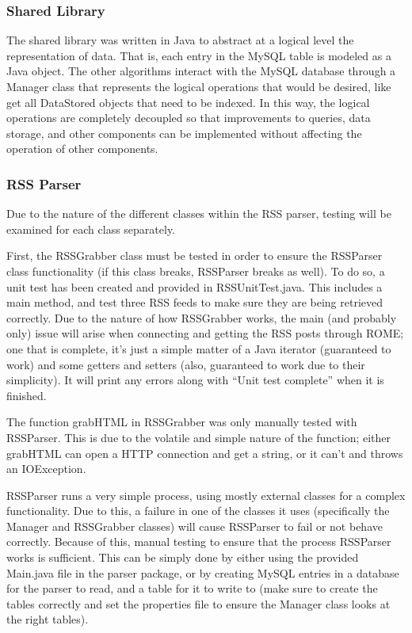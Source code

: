 \documentclass[10pt]{article} %
\begin{document}
\subsubsection{Shared Library}

The shared library was written in Java to abstract at a logical level the representation of data. That is, each entry in the MySQL table is modeled as a Java object. The other algorithms interact with the MySQL database through a Manager class that represents the logical operations that would be desired, like get all DataStored objects that need to be indexed. In this way, the logical operations are completely decoupled so that improvements to queries, data storage, and other components can be implemented without affecting the operation of other components.

\subsubsection{RSS Parser}

Due to the nature of the different classes within the RSS parser, testing will be examined for each class separately.

First, the RSSGrabber class must be tested in order to ensure the RSSParser class functionality (if this class breaks, RSSParser breaks as well). To do so, a unit test has been created and provided in RSSUnitTest.java. This includes a main method, and test three RSS feeds to make sure they are being retrieved correctly. Due to the nature of how RSSGrabber works, the main (and probably only) issue will arise when connecting and getting the RSS posts through ROME; one that is complete, it’s just a simple matter of a Java iterator (guaranteed to work) and some getters and setters (also, guaranteed to work due to their simplicity). It will print any errors along with “Unit test complete” when it is finished.

The function grabHTML in RSSGrabber was only manually tested with RSSParser. This is due to the volatile and simple nature of the function; either grabHTML can open a HTTP connection and get a string, or it can’t and throws an IOException.

RSSParser runs a very simple process, using mostly external classes for a complex functionality. Due to this, a failure in one of the classes it uses (specifically the Manager and RSSGrabber classes) will cause RSSParser to fail or not behave correctly. Because of this, manual testing to ensure that the process RSSParser works is sufficient. This can be simply done by either using the provided Main.java file in the parser package, or by creating MySQL entries in a database for the parser to read, and a table for it to write to (make sure to create the tables correctly and set the properties file to ensure the Manager class looks at the right tables).
\end{document}
